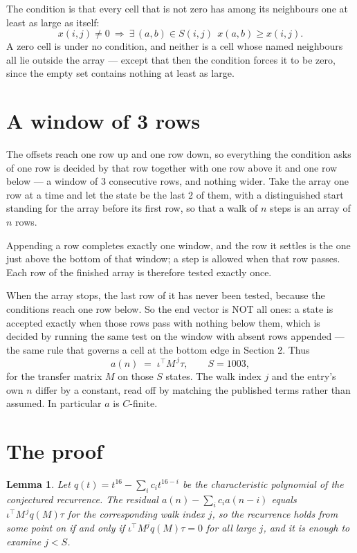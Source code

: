 \documentclass[11pt,a4paper]{article}
\theoremstyle{plain}
\newtheorem{lemma}[theorem]{Lemma}
\theoremstyle{definition}
\begin{document}
The condition is that every cell that is not zero has among its neighbours one at least as large as itself:
\[
x(i,j)\neq0\ \Longrightarrow\ \exists\,(a,b)\in S(i,j)\ \ x(a,b)\ge x(i,j).
\]
A zero cell is under no condition, and neither is a cell whose named neighbours all lie outside the array --- except that then the condition forces it to be zero, since the empty set contains nothing at least as large.

\section{A window of 3 rows}

The offsets reach one row up and one row down, so everything the condition asks of one row is
decided by that row together with one row above it and one row below --- a window of
$3$ consecutive rows, and nothing wider. Take the array one row at a time and
let the state be the last 2 of them, with a distinguished start standing for the array before its
first row, so that a walk of $n$ steps is an array of $n$ rows.

Appending a row completes exactly one window, and the row it settles is the one just above the bottom of that window; a step is
allowed when that row passes. Each row of the finished array is therefore tested exactly once.

When the array stops, the last row of it has never been tested, because the
conditions reach one row below. So the end vector is NOT all ones: a state is accepted exactly when
those rows pass with nothing below them, which is decided by running the same test on the window
with absent rows appended --- the same rule that governs a cell at the bottom edge in
Section 2.
Thus
\[
a(n)\;=\;\iota^{\!\top}M^{\,j}\tau ,\qquad S=1003,
\]
for the transfer matrix $M$ on those $S$ states. The walk index $j$ and the entry's own $n$
differ by a constant, read off by matching the published terms rather than assumed. In
particular $a$ is $C$-finite.

\section{The proof}

\begin{lemma}\label{lem:crit}
Let $q(t)=t^{16}-\sum_i c_it^{16-i}$ be the characteristic polynomial of the
conjectured recurrence. The residual $a(n)-\sum_ic_ia(n-i)$ equals
$\iota^{\!\top}M^{\,j}q(M)\tau$ for the corresponding walk index $j$, so the recurrence
holds from some point on if and only if $\iota^{\!\top}M^{j}q(M)\tau=0$ for all large $j$,
and it is enough to examine $j<S$.
\end{lemma}
\end{document}
